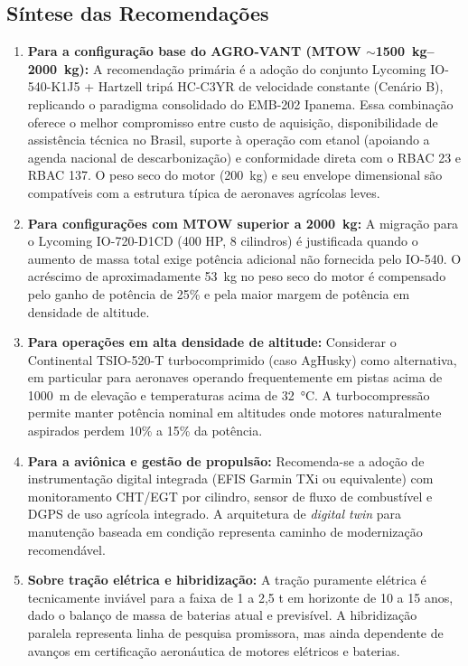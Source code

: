 \documentclass[a4paper,12pt]{article}
\begin{document}
\subsection{Síntese das Recomendações}

\begin{enumerate}
    \item \textbf{Para a configuração base do AGRO-VANT (MTOW $\sim$\SI{1500}{kg}--\SI{2000}{kg}):} A recomendação primária é a adoção do conjunto Lycoming IO-540-K1J5 + Hartzell tripá HC-C3YR de velocidade constante (Cenário B), replicando o paradigma consolidado do EMB-202 Ipanema. Essa combinação oferece o melhor compromisso entre custo de aquisição, disponibilidade de assistência técnica no Brasil, suporte à operação com etanol (apoiando a agenda nacional de descarbonização) e conformidade direta com o RBAC 23 e RBAC 137. O peso seco do motor (\SI{200}{kg}) e seu envelope dimensional são compatíveis com a estrutura típica de aeronaves agrícolas leves.
    
    \item \textbf{Para configurações com MTOW superior a \SI{2000}{kg}:} A migração para o Lycoming IO-720-D1CD (400 HP, 8 cilindros) é justificada quando o aumento de massa total exige potência adicional não fornecida pelo IO-540. O acréscimo de aproximadamente \SI{53}{kg} no peso seco do motor é compensado pelo ganho de potência de 25\% e pela maior margem de potência em densidade de altitude.
    
    \item \textbf{Para operações em alta densidade de altitude:} Considerar o Continental TSIO-520-T turbocomprimido (caso AgHusky) como alternativa, em particular para aeronaves operando frequentemente em pistas acima de \SI{1000}{m} de elevação e temperaturas acima de \SI{32}{\degreeCelsius}. A turbocompressão permite manter potência nominal em altitudes onde motores naturalmente aspirados perdem 10\% a 15\% da potência.
    
    \item \textbf{Para a aviônica e gestão de propulsão:} Recomenda-se a adoção de instrumentação digital integrada (EFIS Garmin TXi ou equivalente) com monitoramento CHT/EGT por cilindro, sensor de fluxo de combustível e DGPS de uso agrícola integrado. A arquitetura de \textit{digital twin} para manutenção baseada em condição representa caminho de modernização recomendável.
    
    \item \textbf{Sobre tração elétrica e hibridização:} A tração puramente elétrica é tecnicamente inviável para a faixa de 1 a 2{,}5 t em horizonte de 10 a 15 anos, dado o balanço de massa de baterias atual e previsível. A hibridização paralela representa linha de pesquisa promissora, mas ainda dependente de avanços em certificação aeronáutica de motores elétricos e baterias.
\end{enumerate}
\end{document}

